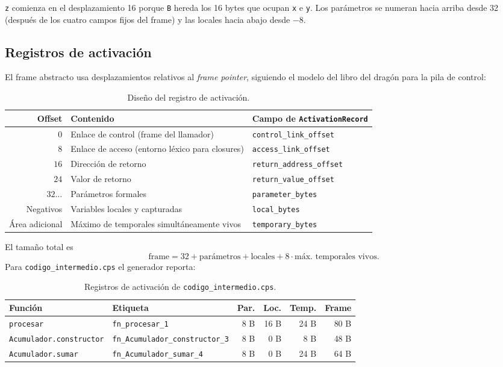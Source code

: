 \documentclass[11pt,a4paper]{article}
\begin{document}
\texttt{z} comienza en el desplazamiento 16 porque \texttt{B} hereda los 16 bytes
que ocupan \texttt{x} e \texttt{y}. Los parámetros se numeran hacia arriba desde
32 (después de los cuatro campos fijos del frame) y las locales hacia abajo desde
$-8$.

\subsection{Registros de activación}

El frame abstracto usa desplazamientos relativos al \emph{frame pointer},
siguiendo el modelo del libro del dragón para la pila de control:

\begin{table}[H]
\centering
\small
\begin{tabular}{@{}rL{5.8cm}L{6.2cm}@{}}
\toprule
\textbf{Offset} & \textbf{Contenido} & \textbf{Campo de \texttt{ActivationRecord}} \\
\midrule
$0$ & Enlace de control (frame del llamador) & \texttt{control\_link\_offset} \\
$8$ & Enlace de acceso (entorno léxico para closures) & \texttt{access\_link\_offset} \\
$16$ & Dirección de retorno & \texttt{return\_address\_offset} \\
$24$ & Valor de retorno & \texttt{return\_value\_offset} \\
$32\ldots$ & Parámetros formales & \texttt{parameter\_bytes} \\
Negativos & Variables locales y capturadas & \texttt{local\_bytes} \\
Área adicional & Máximo de temporales simultáneamente vivos &
\texttt{temporary\_bytes} \\
\bottomrule
\end{tabular}
\caption{Diseño del registro de activación.}
\end{table}

El tamaño total es
\[
  \mbox{frame} = 32 + \mbox{parámetros} + \mbox{locales} +
  8\cdot\mbox{máx.\ temporales vivos}.
\]
Para \texttt{codigo\_intermedio.cps} el generador reporta:

\begin{table}[H]
\centering
\small
\begin{tabular}{@{}llrrrr@{}}
\toprule
\textbf{Función} & \textbf{Etiqueta} & \textbf{Par.} & \textbf{Loc.} & \textbf{Temp.} & \textbf{Frame} \\
\midrule
\texttt{procesar} & \texttt{fn\_procesar\_1} & 8 B & 16 B & 24 B & 80 B \\
\texttt{Acumulador.constructor} & \texttt{fn\_Acumulador\_constructor\_3} & 8 B & 0 B & 8 B & 48 B \\
\texttt{Acumulador.sumar} & \texttt{fn\_Acumulador\_sumar\_4} & 8 B & 0 B & 24 B & 64 B \\
\bottomrule
\end{tabular}
\caption{Registros de activación de \texttt{codigo\_intermedio.cps}.}
\end{table}
\end{document}
